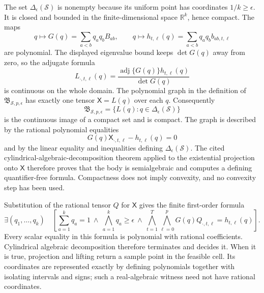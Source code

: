 The set \(\Delta_{\epsilon}(\mathcal S)\) is nonempty because its uniform point has coordinates \(1/k\geq\epsilon\).  It is closed and bounded in the finite-dimensional space \(\mathbb R^k\), hence compact.  The maps
\[
 q\longmapsto G(q)=\sum_{a<b}q_aq_bB_{ab},
 \qquad
 q\longmapsto h_{t,\ell}(q)=\sum_{a<b}q_aq_bb_{ab,t,\ell}
\]
are polynomial.  The displayed eigenvalue bound keeps \(\det G(q)\) away from zero, so the adjugate formula
\[
 L_{\cdot,t,\ell}(q)
 =\frac{\operatorname{adj}\{G(q)\}h_{t,\ell}(q)}{\det G(q)}
\]
is continuous on the whole domain.  The polynomial graph in the definition of \(\mathfrak B_{\mathcal S,p,\epsilon}\) has exactly one tensor \(\mathsf X=L(q)\) over each \(q\).  Consequently
\[
 \mathfrak B_{\mathcal S,p,\epsilon}
 =\{L(q):q\in\Delta_{\epsilon}(\mathcal S)\}
\]
is the continuous image of a compact set and is compact.  The graph is described by the rational polynomial equalities
\[
 G(q)\mathsf X_{\cdot,t,\ell}-h_{t,\ell}(q)=0
\]
and by the linear equality and inequalities defining \(\Delta_{\epsilon}(\mathcal S)\).  The cited cylindrical-algebraic-decomposition theorem applied to the existential projection onto \(\mathsf X\) therefore proves that the body is semialgebraic and computes a defining quantifier-free formula.  Compactness does not imply convexity, and no convexity step has been used.

Substitution of the rational tensor \(Q\) for \(\mathsf X\) gives the finite first-order formula
\[
 \exists(q_1,\ldots,q_k)\quad
 \left[
   \sum_{a=1}^kq_a=1
   \ \wedge\ 
   \bigwedge_{a=1}^k q_a\geq\epsilon
   \ \wedge\ 
   \bigwedge_{t=1}^T\bigwedge_{\ell=0}^p
   G(q)Q_{\cdot,t,\ell}=h_{t,\ell}(q)
 \right].
\]
Every scalar equality in this formula is polynomial with rational coefficients.  Cylindrical algebraic decomposition therefore terminates and decides it.  When it is true, projection and lifting return a sample point in the feasible cell.  Its coordinates are represented exactly by defining polynomials together with isolating intervals and signs; such a real-algebraic witness need not have rational coordinates.

